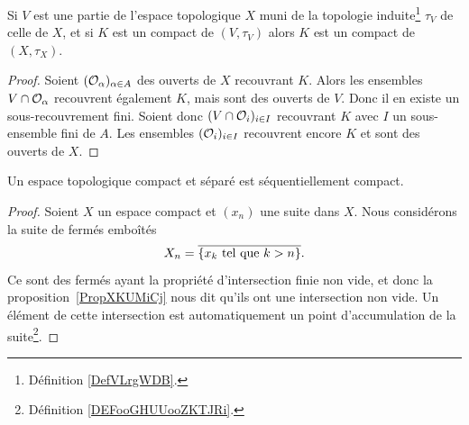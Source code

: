 \begin{proposition}     \label{PropGBZUooRKaOxy}
    Si \( V\) est une partie de l'espace topologique \( X\) muni de la topologie induite\footnote{Définition \ref{DefVLrgWDB}.} \( \tau_V\) de celle de \( X\), et si \( K\) est un compact de \( (V,\tau_V)\) alors \( K\) est un compact de \( (X,\tau_X)\).
\end{proposition}

\begin{proof}
    Soient \(   (\mathcal{O}_\alpha)_{\alpha\in A}  \) des ouverts de \( X\) recouvrant \( K\). Alors les ensembles \( V\cap \mathcal{O}_{\alpha}\) recouvrent également \( K\), mais sont des ouverts de \( V\). Donc il en existe un sous-recouvrement fini. Soient donc \( (V\cap\mathcal{O}_i)_{i\in I}\) recouvrant \( K\) avec \( I\) un sous-ensemble fini de \( A\). Les ensembles \( (\mathcal{O}_i)_{i\in I}\) recouvrent encore \( K\) et sont des ouverts de \( X\).
\end{proof}

\begin{proposition}\label{ThoBWFTXAZNHoo}
    Un espace topologique compact et séparé est séquentiellement compact.
\end{proposition}

\begin{proof}
   Soient \( X\) un espace compact et \( (x_n)\) une suite dans \( X\). Nous considérons la suite de fermés emboîtés
   \begin{equation}
       X_n=\overline{ \{ x_k\text{ tel que } k>n \} }.
   \end{equation}
   Ce sont des fermés ayant la propriété d'intersection finie non vide, et donc la proposition~\ref{PropXKUMiCj} nous dit qu'ils ont une intersection non vide. Un élément de cette intersection est automatiquement un point d'accumulation de la suite\footnote{Définition \ref{DEFooGHUUooZKTJRi}.}.
\end{proof}



